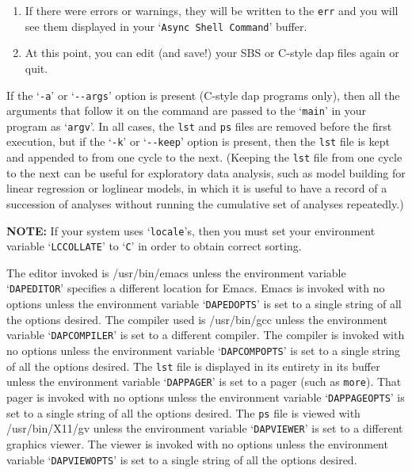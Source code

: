 \documentclass{book}
\renewcommand{\_}{\Texinfounderscore\discretionary{}{}{}}
\begin{document}
\begin{enumerate}[start=1]
\item If there were errors or warnings, they will be written
to the \texttt{err} and you will see them displayed in your
`\texttt{Async Shell Command}' buffer.

\item At this point, you can edit (and save!) your SBS or C-style dap files again or quit.
\end{enumerate}

If the `\texttt{-a}' or `\texttt{{-}{-}args}'
%
%
option is present (C-style dap programs only),
then all the arguments that follow it on the command
are passed to the `\texttt{main}' in your program as `\texttt{argv}'.
In all cases, the \texttt{lst} and \texttt{ps} files
%
%
are removed before the
first execution, but if the `\texttt{-k}' or `\texttt{{-}{-}keep}' option is present, then the \texttt{lst}
file is kept
%
and appended to from one cycle to the next.  
(Keeping the \texttt{lst} file from one cycle to the next can be useful for
exploratory data analysis,
%
%
such as model building for linear regression
or loglinear models, in which it is useful to have a record of a
succession of analyses without running the cumulative set of analyses
repeatedly.)

\textbf{NOTE:} If your system uses `\texttt{locale}'s, then you must set
your environment variable `\texttt{LC\_COLLATE}' to `\texttt{C}' in order to
obtain correct sorting.

The editor
%
invoked is /usr/bin/emacs unless the environment variable `\texttt{DAPEDITOR}'
specifies a different location for Emacs.
Emacs is invoked with no options unless the environment variable
`\texttt{DAPEDOPTS}' is set to a single string of all the options desired.  
The compiler
%
used is /usr/bin/gcc unless the environment variable `\texttt{DAPCOMPILER}'
is set to a different compiler.
The compiler is invoked with no options unless the environment variable
`\texttt{DAPCOMPOPTS}' is set to a single string of all the options desired.  
The \texttt{lst} file is displayed in its entirety in its buffer
unless the environment variable `\texttt{DAPPAGER}' is set to a pager
(such as \texttt{more}).
That pager is invoked with no options unless the environment variable
`\texttt{DAPPAGEOPTS}' is set to a single string of all the options desired.  
The \texttt{ps} file is viewed
%
with /usr/bin/X11/gv unless the environment variable `\texttt{DAPVIEWER}'
is set to a different graphics viewer.
The viewer is invoked with no options unless the environment variable
`\texttt{DAPVIEWOPTS}' is set to a single string of all the options desired.  
\end{document}
